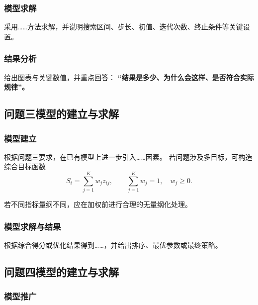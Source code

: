 \documentclass[UTF8,fontset=windows,a4paper,12pt]{ctexart}
\begin{document}
\subsubsection{模型求解}

采用……方法求解，并说明搜索区间、步长、初值、迭代次数、终止条件等关键设置。

\subsubsection{结果分析}

给出图表与关键数值，并重点回答：
\textbf{“结果是多少、为什么会这样、是否符合实际规律”。}

\subsection{问题三模型的建立与求解}

\subsubsection{模型建立}

根据问题三要求，在已有模型上进一步引入……因素。
若问题涉及多目标，可构造综合目标函数
\begin{equation}
  S_i=\sum_{j=1}^{K}w_jz_{ij},
  \qquad
  \sum_{j=1}^{K}w_j=1,\quad w_j\ge 0.
  \label{eq:q3-score}
\end{equation}

若不同指标量纲不同，应在加权前进行合理的无量纲化处理。

\subsubsection{模型求解与结果}

根据综合得分或优化结果得到……，并给出排序、最优参数或最终策略。

\subsection{问题四模型的建立与求解}


\subsubsection{模型推广}
\end{document}
